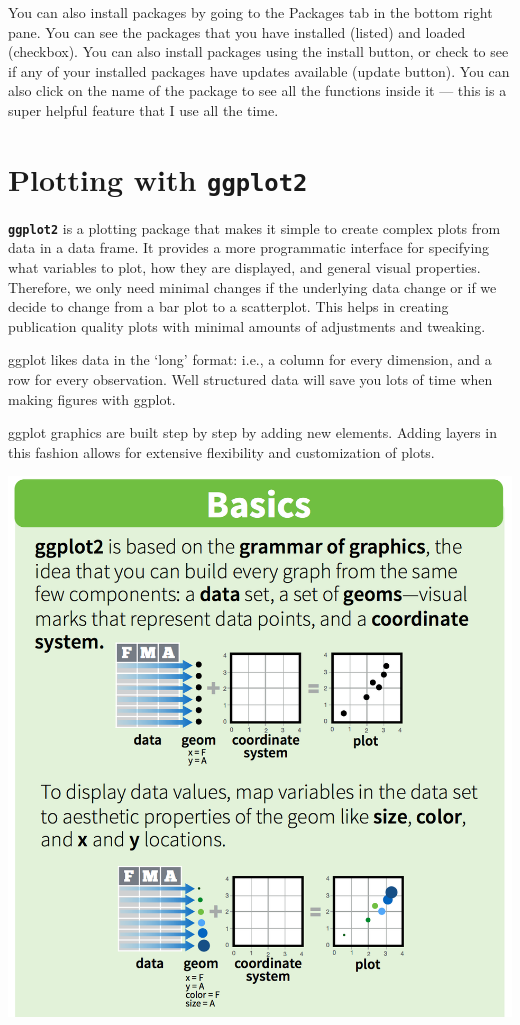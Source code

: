 \documentclass[]{book}
\theoremstyle{definition}
\theoremstyle{definition}
\theoremstyle{definition}
\theoremstyle{remark}
\begin{document}
You can also install packages by going to the Packages tab in the bottom
right pane. You can see the packages that you have installed (listed)
and loaded (checkbox). You can also install packages using the install
button, or check to see if any of your installed packages have updates
available (update button). You can also click on the name of the package
to see all the functions inside it --- this is a super helpful feature
that I use all the time.

\section{\texorpdfstring{Plotting with
\textbf{\texttt{ggplot2}}}{Plotting with ggplot2}}\label{plotting-with-ggplot2}

\textbf{\texttt{ggplot2}} is a plotting package that makes it simple to
create complex plots from data in a data frame. It provides a more
programmatic interface for specifying what variables to plot, how they
are displayed, and general visual properties. Therefore, we only need
minimal changes if the underlying data change or if we decide to change
from a bar plot to a scatterplot. This helps in creating publication
quality plots with minimal amounts of adjustments and tweaking.

ggplot likes data in the `long' format: i.e., a column for every
dimension, and a row for every observation. Well structured data will
save you lots of time when making figures with ggplot.

ggplot graphics are built step by step by adding new elements. Adding
layers in this fashion allows for extensive flexibility and
customization of plots.

 \includegraphics{img/rstudio-cheatsheet-ggplot.png}
\end{document}
